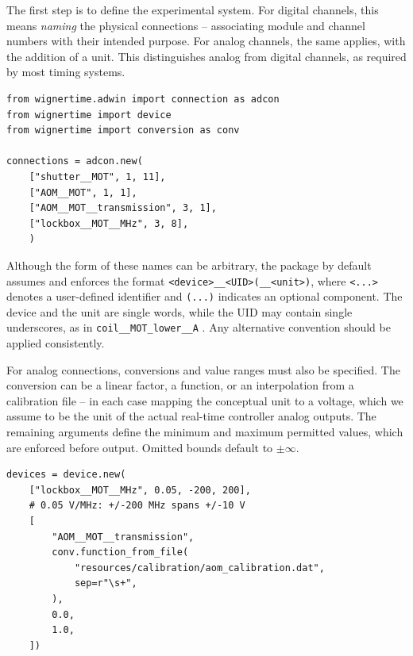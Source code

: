 \documentclass{SciPost}
\newcommand{\python}[1]{%
  \texttt{#1}%
}
\begin{document}
The first step is to define the experimental system. For digital channels, this means \emph{naming} the physical connections – associating module and channel numbers with their intended purpose. For analog channels, the same applies, with the addition of a unit. This distinguishes analog from digital channels, as required by most timing systems.
%
\begin{verbatim}
from wignertime.adwin import connection as adcon
from wignertime import device
from wignertime import conversion as conv
 
connections = adcon.new(
    ["shutter__MOT", 1, 11],
    ["AOM__MOT", 1, 1],
    ["AOM__MOT__transmission", 3, 1],
    ["lockbox__MOT__MHz", 3, 8],
    )
\end{verbatim}
%
Although the form of these names can be arbitrary, the package by default assumes and enforces the format \texttt{<device>\_\_<UID>(\_\_<unit>)}, where \texttt{<...>} denotes a user-defined identifier and \texttt{(...)} indicates an optional component. The device and the unit are single words, while the UID may contain single underscores, as in \python{coil__MOT_lower__A}. Any alternative convention should be applied consistently.
 
For analog connections, conversions and value ranges must also be specified. The conversion can be a linear factor, a function, or an interpolation from a calibration file – in each case mapping the conceptual unit to a voltage, which we assume to be the unit of the actual real-time controller analog outputs. The remaining arguments define the minimum and maximum permitted values, which are enforced before output. Omitted bounds default to $\pm\infty$.
%
\begin{verbatim}
devices = device.new(
    ["lockbox__MOT__MHz", 0.05, -200, 200], 
    # 0.05 V/MHz: +/-200 MHz spans +/-10 V
    [
        "AOM__MOT__transmission",
        conv.function_from_file(
            "resources/calibration/aom_calibration.dat",
            sep=r"\s+",
        ),
        0.0,
        1.0,
    ])
\end{verbatim}
 
\end{document}
